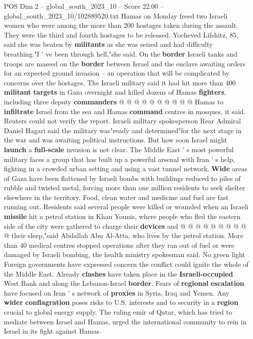\begin{textsample}{POS Dim 2 – global\_south\_2023\_10 – Score 22.00 – global\_south\_2023\_10/102889520.txt}
Hamas on Monday freed two Israeli women who were among the more than 200 hostages taken during the assault.
They were the third and fourth hostages to be released.
Yocheved Lifshitz, 85, said she was beaten by \textbf{militants} as she was seized and had difficulty breathing."I ' ve been through hell,"she said.
On the \textbf{border} Israeli tanks and troops are massed on the \textbf{border} between Israel and the enclave awaiting orders for an expected ground invasion -- an operation that will be complicated by concerns over the hostages.
The Israeli military said it had hit more than 400 \textbf{militant} \textbf{targets} in Gaza overnight and killed dozens of Hamas \textbf{fighters}, including three deputy \textbf{commanders} @ @ @ @ @ @ @ @ @ @ Hamas to \textbf{infiltrate} Israel from the sea and Hamas \textbf{command} centres in mosques, it said.
Reuters could not verify the report.
Israeli military spokesperson Rear Admiral Daniel Hagari said the military was"ready and determined"for the next stage in the war and was awaiting political instructions.
But how soon Israel might \textbf{launch} a \textbf{full-scale} invasion is not clear.
The Middle East ' s most powerful military faces a group that has built up a powerful arsenal with Iran ' s help, fighting in a crowded urban setting and using a vast tunnel network. \textbf{Wide} areas of Gaza have been flattened by Israeli bombs with buildings reduced to piles of rubble and twisted metal, forcing more than one million residents to seek shelter elsewhere in the territory.
Food, clean water and medicine and fuel are fast running out.
Residents said several people were killed or wounded when an Israeli \textbf{missile} hit a petrol station in Khan Younis, where people who fled the eastern side of the city were gathered to charge their \textbf{devices} and @ @ @ @ @ @ @ @ @ @ their sleep,"said Abdallah Abu Al-Atta, who lives by the petrol station.
More than 40 medical centres stopped operations after they ran out of fuel or were damaged by Israeli bombing, the health ministry spokesman said.
No green light Foreign governments have expressed concern the conflict could ignite the whole of the Middle East.
Already \textbf{clashes} have taken place in the \textbf{Israeli-occupied} West Bank and along the Lebanon-Israel \textbf{border}.
Fears of \textbf{regional} \textbf{escalation} have focused on Iran ' s network of \textbf{proxies} in Syria, Iraq and Yemen.
Any \textbf{wider} \textbf{conflagration} poses risks to U.S. interests and to security in a \textbf{region} crucial to global energy supply.
The ruling emir of Qatar, which has tried to mediate between Israel and Hamas, urged the international community to rein in Israel in its fight against Hamas.

\end{textsample}
